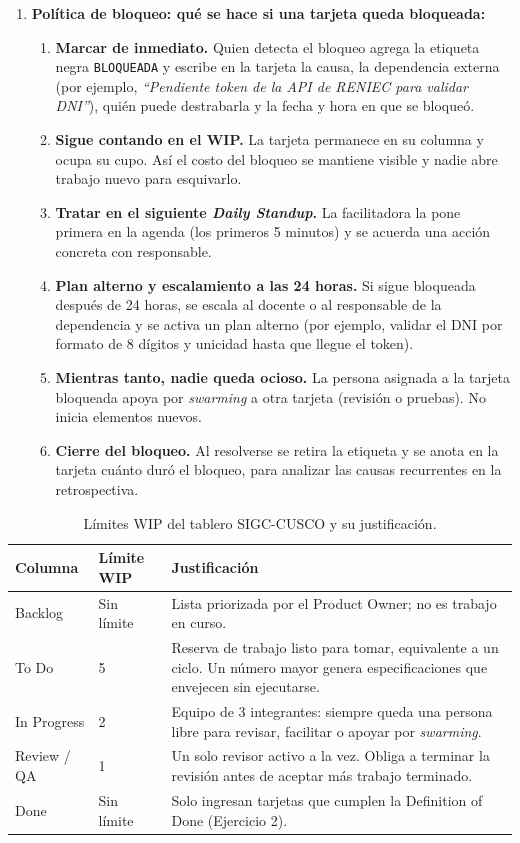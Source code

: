 \documentclass[11pt,a4paper]{article}
\begin{document}
\begin{enumerate}
    \item \textbf{Política de bloqueo: qué se hace si una tarjeta queda bloqueada:}
    \begin{enumerate}
        \item \textbf{Marcar de inmediato.} Quien detecta el bloqueo agrega la etiqueta negra \texttt{BLOQUEADA} y escribe en la tarjeta la causa, la dependencia externa (por ejemplo, \textit{``Pendiente token de la API de RENIEC para validar DNI''}), quién puede destrabarla y la fecha y hora en que se bloqueó.
        \item \textbf{Sigue contando en el WIP.} La tarjeta permanece en su columna y ocupa su cupo. Así el costo del bloqueo se mantiene visible y nadie abre trabajo nuevo para esquivarlo.
        \item \textbf{Tratar en el siguiente \textit{Daily Standup}.} La facilitadora la pone primera en la agenda (los primeros 5 minutos) y se acuerda una acción concreta con responsable.
        \item \textbf{Plan alterno y escalamiento a las 24 horas.} Si sigue bloqueada después de 24 horas, se escala al docente o al responsable de la dependencia y se activa un plan alterno (por ejemplo, validar el DNI por formato de 8 dígitos y unicidad hasta que llegue el token).
        \item \textbf{Mientras tanto, nadie queda ocioso.} La persona asignada a la tarjeta bloqueada apoya por \textit{swarming} a otra tarjeta (revisión o pruebas). No inicia elementos nuevos.
        \item \textbf{Cierre del bloqueo.} Al resolverse se retira la etiqueta y se anota en la tarjeta cuánto duró el bloqueo, para analizar las causas recurrentes en la retrospectiva.
    \end{enumerate}
\end{enumerate}

\begin{table}[H]
\centering
\small
\renewcommand{\arraystretch}{1.2}
\begin{tabularx}{\textwidth}{P{2.6cm}P{2.2cm}Y}
\toprule
\textbf{Columna} & \textbf{Límite WIP} & \textbf{Justificación} \\
\midrule
Backlog & Sin límite & Lista priorizada por el Product Owner; no es trabajo en curso. \\
To Do & 5 & Reserva de trabajo listo para tomar, equivalente a un ciclo. Un número mayor genera especificaciones que envejecen sin ejecutarse. \\
In Progress & 2 & Equipo de 3 integrantes: siempre queda una persona libre para revisar, facilitar o apoyar por \textit{swarming}. \\
Review / QA & 1 & Un solo revisor activo a la vez. Obliga a terminar la revisión antes de aceptar más trabajo terminado. \\
Done & Sin límite & Solo ingresan tarjetas que cumplen la Definition of Done (Ejercicio 2). \\
\bottomrule
\end{tabularx}
\caption{Límites WIP del tablero SIGC-CUSCO y su justificación.}
\label{tab:wip}
\end{table}
\end{document}
